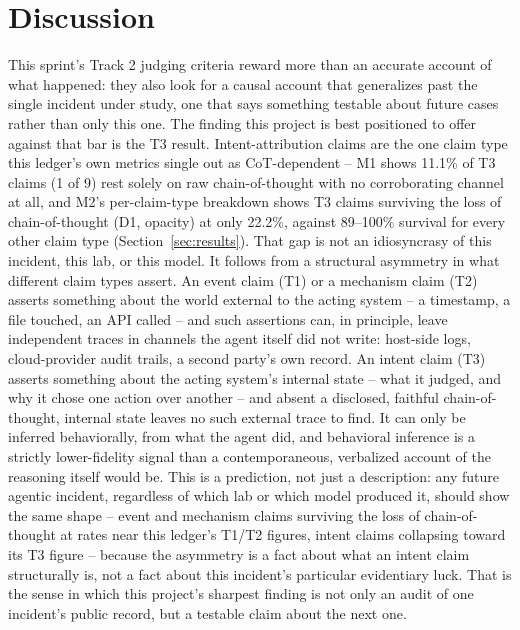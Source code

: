 
\section{Discussion}
\label{sec:discussion}

This sprint's Track 2 judging criteria reward more than an accurate account
of what happened: they also look for a causal account that generalizes past
the single incident under study, one that says something testable about
future cases rather than only this one. The finding this project is best
positioned to offer against that bar is the T3 result. Intent-attribution
claims are the one claim type this ledger's own metrics single out as
CoT-dependent -- M1 shows 11.1\% of T3 claims (1 of 9) rest solely on raw
chain-of-thought with no corroborating channel at all, and M2's per-claim-type
breakdown shows T3 claims surviving the loss of chain-of-thought (D1,
opacity) at only 22.2\%, against 89--100\% survival for every other claim
type (Section~\ref{sec:results}). That gap is not an idiosyncrasy of this
incident, this lab, or this model. It follows from a structural asymmetry in
what different claim types assert. An event claim (T1) or a mechanism claim
(T2) asserts something about the world external to the acting system -- a
timestamp, a file touched, an API called -- and such assertions can, in
principle, leave independent traces in channels the agent itself did not
write: host-side logs, cloud-provider audit trails, a second party's own
record. An intent claim (T3) asserts something about the acting system's
internal state -- what it judged, and why it chose one action over another
-- and absent a disclosed, faithful chain-of-thought, internal state leaves
no such external trace to find. It can only be inferred behaviorally, from
what the agent did, and behavioral inference is a strictly lower-fidelity
signal than a contemporaneous, verbalized account of the reasoning itself
would be. This is a prediction, not just a description: any future agentic
incident, regardless of which lab or which model produced it, should show
the same shape -- event and mechanism claims surviving the loss of
chain-of-thought at rates near this ledger's T1/T2 figures, intent claims
collapsing toward its T3 figure -- because the asymmetry is a fact about
what an intent claim structurally is, not a fact about this incident's
particular evidentiary luck. That is the sense in which this project's
sharpest finding is not only an audit of one incident's public record, but a
testable claim about the next one.

